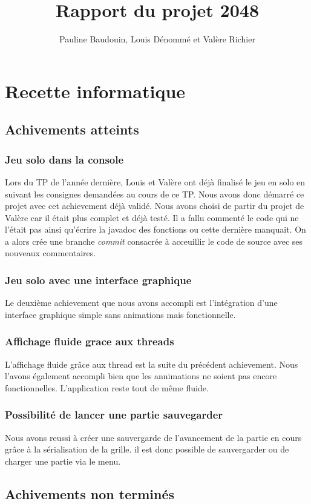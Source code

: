 \documentclass[a4paper,10pt]{report}
\title{Rapport du projet 2048}
\author{Pauline Baudouin, Louis Dénommé et Valère Richier}
\begin{document}
\maketitle
\part{Recette informatique}
  \chapter{Achivements atteints}
    \section{Jeu solo dans la console}
      Lors du TP de l'année dernière, Louis et Valère ont déjà finalisé le jeu en solo en suivant les consignes demandées au cours de ce TP.
      Nous avons donc démarré ce projet avec cet achievement déjà validé. Nous avons choisi de partir du projet de Valère car il était plus complet et déjà testé. 
      Il a fallu commenté le code qui ne l'était pas ainsi qu'écrire la javadoc des fonctions ou cette dernière manquait. On a alors crée une branche \textit{commit} consacrée 
      à acceuillir le code de source avec ses nouveaux commentaires.
      
    \section{Jeu solo avec une interface graphique}
      Le deuxième achievement que nous avons accompli est l'intégration d'une interface graphique simple sans animations mais fonctionnelle.
    \section{Affichage fluide grace aux threads}
      L'affichage fluide grâce aux thread est la suite du précédent achievement. Nous l'avons également accompli bien que les annimations ne soient pas encore fonctionnelles.
      L'application reste tout de même fluide.
    \section{Possibilité de lancer une partie sauvegarder}
      Nous avons reussi à créer une sauvergarde de l'avancement de la partie en cours grâce à la sérialisation de la grille. il est donc possible de sauvergarder ou de charger une partie via le menu.
  \chapter{Achivements non terminés}
\end{document}
